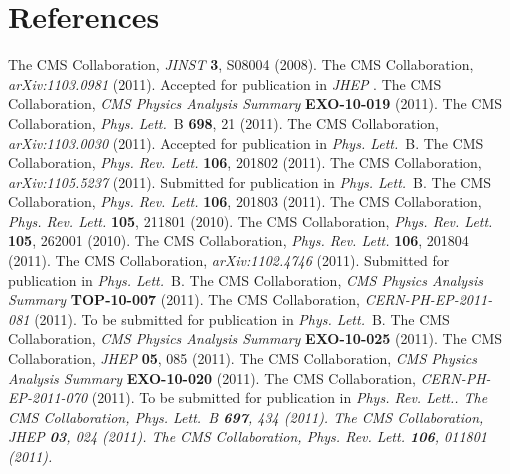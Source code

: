 \documentclass[11pt]{article}
\def\Journal#1#2#3#4{{#1} {\bf #2}, #3 (#4)}
\def\PLB{{\em Phys. Lett.}~B}
\def\PRL{\em Phys. Rev. Lett.}
\def\PRD{{\em Phys. Rev.}~D}
\def\JINST{{\em JINST} }
\def\JHEP{{\em JHEP} }
\begin{document}
\section*{References}
\begin{thebibliography}{99}

The CMS Collaboration, \Journal{\JINST}{3}{S08004}{2008}.
The CMS Collaboration, {\em arXiv:1103.0981} (2011). Accepted for publication in \JHEP.
The CMS Collaboration, {\em CMS Physics Analysis Summary} {\bf EXO-10-019} (2011).
The CMS Collaboration, \Journal{\PLB}{698}{21}{2011}.
The CMS Collaboration, {\em arXiv:1103.0030} (2011). Accepted for publication in \PLB.
The CMS Collaboration, \Journal{\PRL}{106}{201802}{2011}.
The CMS Collaboration, {\em arXiv:1105.5237} (2011). Submitted for publication in \PLB.
The CMS Collaboration, \Journal{\PRL}{106}{201803}{2011}.
The CMS Collaboration, \Journal{\PRL}{105}{211801}{2010}.
The CMS Collaboration, \Journal{\PRL}{105}{262001}{2010}.
The CMS Collaboration, \Journal{\PRL}{106}{201804}{2011}.
The CMS Collaboration, {\em arXiv:1102.4746} (2011). Submitted for publication in \PLB.
The CMS Collaboration, {\em CMS Physics Analysis Summary} {\bf TOP-10-007} (2011).
The CMS Collaboration, {\em CERN-PH-EP-2011-081} (2011). To be submitted for publication in \PLB.
The CMS Collaboration, {\em CMS Physics Analysis Summary} {\bf EXO-10-025} (2011).
The CMS Collaboration, \Journal{\JHEP}{05}{085}{2011}.
The CMS Collaboration, {\em CMS Physics Analysis Summary} {\bf EXO-10-020} (2011).
The CMS Collaboration, {\em CERN-PH-EP-2011-070} (2011). To be submitted for publication in \PRL.
The CMS Collaboration, \Journal{\PLB}{697}{434}{2011}.
The CMS Collaboration, \Journal{\JHEP}{03}{024}{2011}.
The CMS Collaboration, \Journal{\PRL}{106}{011801}{2011}.


\end{thebibliography}
\end{document}
